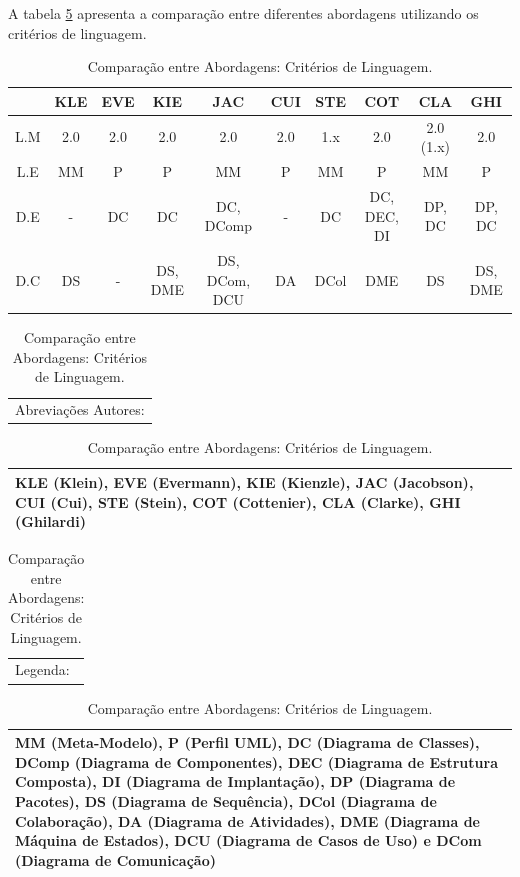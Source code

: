 A tabela \ref{tab:comparison_table_language} apresenta a comparação entre diferentes abordagens utilizando os critérios de linguagem.

\begin{table}[h]
	\centering
	\begin{tabular}{ | c | c | c | c | c | c | c | c | c | c | }
		\hline
		 & KLE & EVE & KIE & JAC & CUI & STE & COT & CLA & GHI \\
		\hline
		 L.M & 2.0 & 2.0 & 2.0 & 2.0 & 2.0 & 1.x & 2.0 & 2.0 (1.x) & 2.0 \\
		\hline
		 L.E & MM & P & P & MM & P & MM & P & MM & P \\
		\hline
		 D.E & - & DC & DC & DC, DComp & - & DC & DC, DEC, DI & DP, DC & DP, DC\\
		\hline
		 D.C & DS & - & DS, DME & DS, DCom, DCU & DA & DCol & DME & DS & DS, DME \\
		\hline
	\end{tabular}
	
	\hspace{2em}

	\begin{tabular}{  p{16.6cm}  }
		Abreviações Autores: \\
	\end{tabular}
	
	\begin{tabular}{ | p{16.6cm} | }
		\hline
		KLE (Klein), EVE (Evermann), KIE (Kienzle), JAC (Jacobson), CUI (Cui), STE (Stein), COT (Cottenier), CLA (Clarke), GHI (Ghilardi) \\
		\hline
	\end{tabular}
	
	\begin{tabular}{  p{16.6cm}  }
		Legenda: \\
	\end{tabular}

	\begin{tabular}{ | p{16.6cm} | }
		\hline
		MM (Meta-Modelo), P (Perfil UML), DC (Diagrama de Classes), DComp (Diagrama de Componentes), DEC (Diagrama de Estrutura Composta), DI
		(Diagrama de Implantação), DP (Diagrama de Pacotes), DS (Diagrama de Sequência), DCol (Diagrama de Colaboração), DA (Diagrama de Atividades), 
		DME (Diagrama de Máquina de Estados), DCU (Diagrama de Casos de Uso) e DCom (Diagrama de Comunicação)\\
		\hline
	\end{tabular}
	\caption{Comparação entre Abordagens: Critérios de Linguagem.}
	\label{tab:comparison_table_language}
\end{table} 

